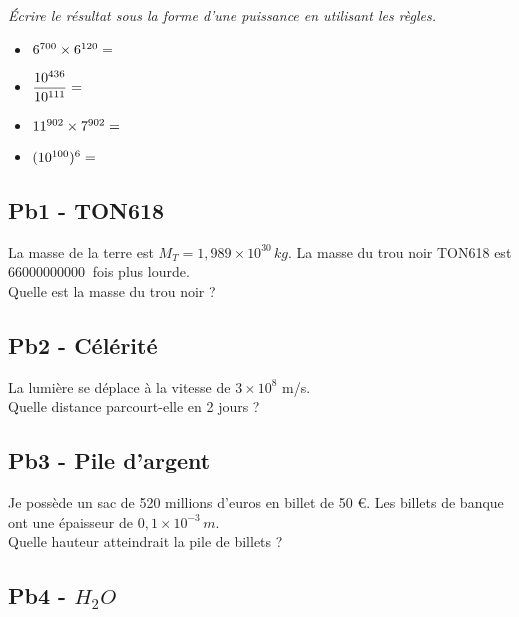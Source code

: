 \textit{Écrire le résultat sous la forme d'une puissance en utilisant les règles.}

\begin{multicols}{2}
  \begin{itemize}[label={$\bullet$}]
  \item $6^{700}  \times  6^{120}  =  \dotfill$
  \item $\dfrac{10^{436}}{10^{111}} = \dotfill$
  \item $11^{902} \times 7^{902} = \dotfill$
  \item $(10^{100})^{6} = \dotfill$
  \end{itemize}
\end{multicols}

\subsection*{Pb1 - TON618} 

La masse de la terre est $M_T = 1,989 \times 10^{30} \, kg$. \newline
La masse du trou noir TON618 est $\SI{66 000 000 000}{}$ fois plus lourde. \\

Quelle est la masse du trou noir ?

\Pointilles[5]

\subsection*{Pb2 - Célérité}

La lumière se déplace à la vitesse de $3 \times 10^8$ m/s. \\

Quelle distance parcourt-elle en 2 jours ?

\Pointilles[6]

\newpage

\subsection*{Pb3 - Pile d'argent}

Je possède un sac de 520 millions d’euros en billet de 50 \euro{}. Les billets de banque ont une épaisseur de $0,1 \times 10^{-3} \, m$. \\

Quelle hauteur atteindrait la pile de billets ?

\Pointilles[5]

\subsection*{Pb4 - $H_{2}O$} 

